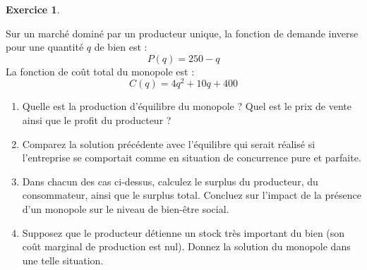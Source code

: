 \documentclass[
]{book}
\providecommand{\tightlist}{%
  \setlength{\itemsep}{0pt}\setlength{\parskip}{0pt}}
\theoremstyle{definition}
\theoremstyle{definition}
\theoremstyle{definition}
\newtheorem{exercise}{Exercice}[chapter]
\theoremstyle{definition}
\theoremstyle{remark}
\begin{document}
\begin{exercise}
\protect\hypertarget{exr:monoexo3}{}\label{exr:monoexo3}

Sur un marché dominé par un producteur unique, la fonction de demande inverse pour une quantité \(q\) de bien est :
\[P(q)=250-q\]
La fonction de coût total du monopole est :
\[C(q)=4q^2+10q+400\]

\begin{enumerate}
\def\labelenumi{\arabic{enumi}.}
\tightlist
\item
  Quelle est la production d'équilibre du monopole ? Quel est le
  prix de vente ainsi que le profit du producteur ?
\item
  Comparez la solution précédente avec l'équilibre qui serait
  réalisé si l'entreprise se comportait comme en situation de
  concurrence pure et parfaite.
\item
  Dans chacun des cas ci-dessus, calculez le surplus du
  producteur, du consommateur, ainsi que le surplus total. Concluez
  sur l'impact de la présence d'un monopole sur le niveau de bien-être
  social.
\item
  Supposez que le producteur détienne un stock très important du bien
  (son coût marginal de production est nul). Donnez la solution du
  monopole dans une telle situation.
\end{enumerate}

\end{exercise}
\end{document}
